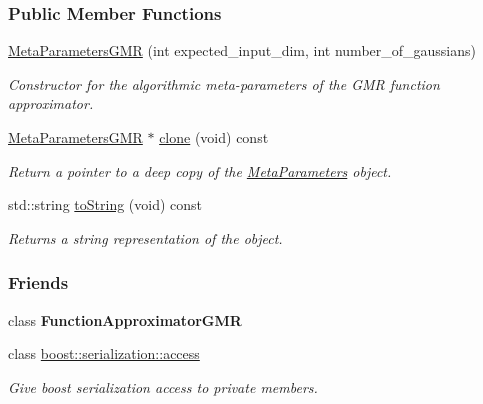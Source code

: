 \subsubsection*{Public Member Functions}
\begin{DoxyCompactItemize}
\item 
\hyperlink{classDmpBbo_1_1MetaParametersGMR_a63110f4ac8f8e509e5af3ca0fb762793}{Meta\+Parameters\+G\+M\+R} (int expected\+\_\+input\+\_\+dim, int number\+\_\+of\+\_\+gaussians)
\begin{DoxyCompactList}\small\item\em Constructor for the algorithmic meta-\/parameters of the G\+M\+R function approximator. \end{DoxyCompactList}\item 
\hyperlink{classDmpBbo_1_1MetaParametersGMR}{Meta\+Parameters\+G\+M\+R} $\ast$ \hyperlink{classDmpBbo_1_1MetaParametersGMR_a6a8080c6a71576a4f79c3c030e2c1ea1}{clone} (void) const 
\begin{DoxyCompactList}\small\item\em Return a pointer to a deep copy of the \hyperlink{classDmpBbo_1_1MetaParameters}{Meta\+Parameters} object. \end{DoxyCompactList}\item 
std\+::string \hyperlink{classDmpBbo_1_1MetaParametersGMR_a1aca816b42cf0d36118be0ab91120d77}{to\+String} (void) const 
\begin{DoxyCompactList}\small\item\em Returns a string representation of the object. \end{DoxyCompactList}\end{DoxyCompactItemize}
\subsubsection*{Friends}
\begin{DoxyCompactItemize}
\item 
\hypertarget{classDmpBbo_1_1MetaParametersGMR_a6f9f278fd7746f1df449e4a6af500b0f}{class {\bfseries Function\+Approximator\+G\+M\+R}}\label{classDmpBbo_1_1MetaParametersGMR_a6f9f278fd7746f1df449e4a6af500b0f}

\item 
class \hyperlink{classDmpBbo_1_1MetaParametersGMR_ac98d07dd8f7b70e16ccb9a01abf56b9c}{boost\+::serialization\+::access}
\begin{DoxyCompactList}\small\item\em Give boost serialization access to private members. \end{DoxyCompactList}\end{DoxyCompactItemize}
